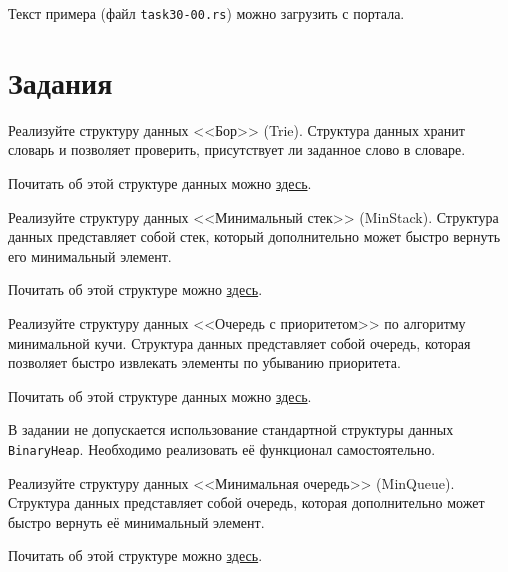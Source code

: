 \documentclass[a4paper, 10pt]{extarticle}
\begin{document}

Текст примера (файл \verb"task30-00.rs") можно загрузить с портала.

\section{Задания}

\begin{tsk}[Бор]
Реализуйте структуру данных <<Бор>> (Trie). Структура данных хранит словарь и позволяет проверить, присутствует ли заданное слово в словаре.

Почитать об этой структуре данных можно \href{https://neerc.ifmo.ru/wiki/index.php?title=%D0%91%D0%BE%D1%80}{здесь}.
\end{tsk}

\begin{tsk}
    Реализуйте структуру данных <<Минимальный стек>> (MinStack). Структура данных представляет собой стек, который дополнительно может быстро вернуть его минимальный элемент.

    Почитать об этой структуре можно \href{http://e-maxx.ru/algo/stacks_for_minima}{здесь}.
\end{tsk}

\begin{tsk}
    Реализуйте структуру данных <<Очередь с приоритетом>> по алгоритму минимальной кучи. Структура данных представляет собой очередь, которая позволяет быстро извлекать элементы по убыванию приоритета.

    Почитать об этой структуре данных можно \href{https://neerc.ifmo.ru/wiki/index.php?title=%D0%94%D0%B2%D0%BE%D0%B8%D1%87%D0%BD%D0%B0%D1%8F_%D0%BA%D1%83%D1%87%D0%B0}{здесь}.

    В задании не допускается использование стандартной структуры данных \verb|BinaryHeap|. Необходимо реализовать её функционал самостоятельно.
\end{tsk}


\begin{tsk}
    Реализуйте структуру данных <<Минимальная очередь>> (MinQueue). Структура данных представляет собой очередь, которая дополнительно может быстро вернуть её минимальный элемент.

    Почитать об этой структуре можно \href{http://e-maxx.ru/algo/stacks_for_minima}{здесь}.
\end{tsk}
\end{document}
